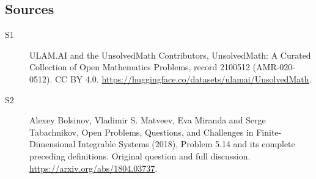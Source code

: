 \documentclass[11pt]{article}
\begin{document}
\subsection{Sources}
\begin{description}
\item[\hypertarget{source:2100512:1}{S1}] ULAM.AI and the UnsolvedMath Contributors, UnsolvedMath: A Curated Collection of Open Mathematics Problems, record 2100512 (AMR-020-0512). CC BY 4.0. \url{https://huggingface.co/datasets/ulamai/UnsolvedMath}.
\item[\hypertarget{source:2100512:2}{S2}] Alexey Bolsinov, Vladimir S. Matveev, Eva Miranda and Serge Tabachnikov, Open Problems, Questions, and Challenges in Finite-Dimensional Integrable Systems (2018), Problem 5.14 and its complete preceding definitions. Original question and full discussion. \url{https://arxiv.org/abs/1804.03737}.

\end{description}
\label{end:2100512}
\end{document}
